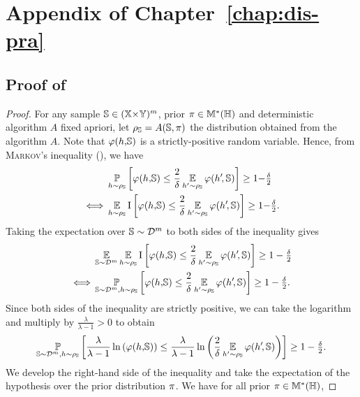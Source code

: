 \chapter{Appendix of Chapter~\ref{chap:dis-pra}}
\label{ap:dis-pra}

\begin{noaddcontents}
\section{Proof of }
\label{chap:dis-pra:sec:proof-disintegrated}

\theoremdisintegrated*
\begin{proof}
For any sample $\S\in(\X{\times}\Y)^\m$, prior $\P\in\M^{*}(\H)$ and deterministic algorithm $A$ fixed apriori, let $\AQ=A(\S, \P)$ the distribution obtained from the algorithm $A$.
Note that $\varphi(\h,\!\S)$ is a strictly-positive random variable.
Hence, from \textsc{Markov}'s inequality (), we have
\begin{align*}
&\PP_{\h\sim \AQ}\LB\varphi(\h,\!\S)\le \frac{2}{\delta}\EE_{\h'{\sim} \AQ}\varphi(\h'\!, \S)\RB\ge 1{-}\tfrac{\delta}{2}\\
\iff &\EE_{\h\sim \AQ}\indic\LB \varphi(\h,\!\S)\le \frac{2}{\delta}\EE_{\h'{\sim} \AQ}\varphi(\h'\!, \S) \RB\ge 1{-}\tfrac{\delta}{2}.
\end{align*}
Taking the expectation over $\S\sim\D^{\m}$ to both sides of the inequality gives 
\begin{align*}
&\EE_{\S\sim\D^{\m}}\EE_{\h\sim \AQ}\indic\LB \varphi(\h,\!\S)\le \frac{2}{\delta}\EE_{\h'{\sim} \AQ}\varphi(\h'\!, \S) \RB\ge 1-\tfrac{\delta}{2}\\
\iff &\PP_{\S\sim\D^{\m},\h\sim \AQ}\LB \varphi(\h,\!\S)\le \frac{2}{\delta}\EE_{\h'{\sim} \AQ}\varphi(\h'\!, \S) \RB\ge 1-\tfrac{\delta}{2}.
\end{align*}
Since both sides of the inequality are strictly positive, we can take the logarithm and multiply by $\frac{\lambda}{\lambda-1}>0$ to obtain
\begin{align*}
\PP_{\S\sim\D^{\m},\h\sim \AQ}\LB\frac{\lambda}{\lambda-1}\ln\LP\varphi(\h,\!\S)\RP \le \frac{\lambda}{\lambda-1}\ln\LP\frac{2}{\delta}\EE_{\h'{\sim} \AQ}\varphi(\h'\!, \S)\RP\RB\ge 1-\tfrac{\delta}{2}.
\end{align*}
We develop the right-hand side of the inequality and take the expectation of the hypothesis over the prior distribution $\P$. 
We have for all prior $\P\in\M^{*}(\H)$,

\end{proof}
\end{noaddcontents}

